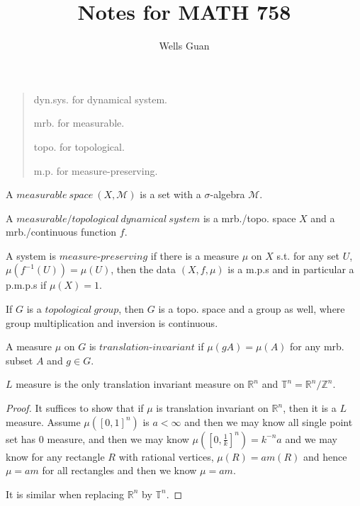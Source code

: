 \documentclass[lang=en, color=blue, ]{elegantbook}
\title{Notes for MATH 758}
\author{Wells Guan}
\newcommand{\R}{\mathbb{R}}
\newcommand{\Z}{\mathbb{Z}}
\newcommand{\M}{\mathcal{M}}
\newcommand{\T}{\mathbb{T}}
\begin{document}
\maketitle


\chapter{}
\begin{quotation}
dyn.sys. for dynamical system.\par
mrb. for measurable.\par
topo. for topological.\par
m.p. for measure-preserving.\par
\end{quotation}
\begin{definition}
    A $measurable\ space\ (X,\M)$ is a set with a $\sigma$-algebra $\M$.\par
    A $measurable/topological\ dynamical\ system$ is a mrb./topo. space $X$ and a mrb./continuous function $f$.\par
    A system is $measure$-$preserving$ if there is a measure $\mu$ on $X$ s.t. for any set $U$, $\mu(f^{-1}(U)) = \mu(U)$, then the data $(X,f,\mu)$ is a m.p.s and in particular a p.m.p.s if $\mu(X)=1$.\par
\end{definition}
\begin{definition}
If $G$ is a $topological\ group$, then $G$ is a topo. space and a group as well, where group multiplication and inversion is continuous.\par
A measure $\mu$ on $G$ is $translation$-$invariant$ if $\mu(gA) = \mu(A)$ for any mrb. subset $A$ and $g\in G$.\par
\end{definition}

\begin{proposition}
    $L$ measure is the only translation invariant measure on $\R^n$ and $\T^n = \R^n/\Z^n$.
\end{proposition}
\begin{proof}\par
    It suffices to show that if $\mu$ is translation invariant on $\R^n$, then it is a $L$ measure. Assume $\mu([0,1]^n)$ is $a<\infty$ and then we may know all single point set has $0$ measure, and then we may know $\mu([0,\tfrac{1}{k}]^n) = k^{-n}a$ and we may know for any rectangle $R$ with rational vertices, $\mu(R) = am(R)$ and hence $\mu = am$ for all rectangles and then we know $\mu = am$.\par
    It is similar when replacing $\R^n$ by $\T^n$.\par
\end{proof}
\end{document}
